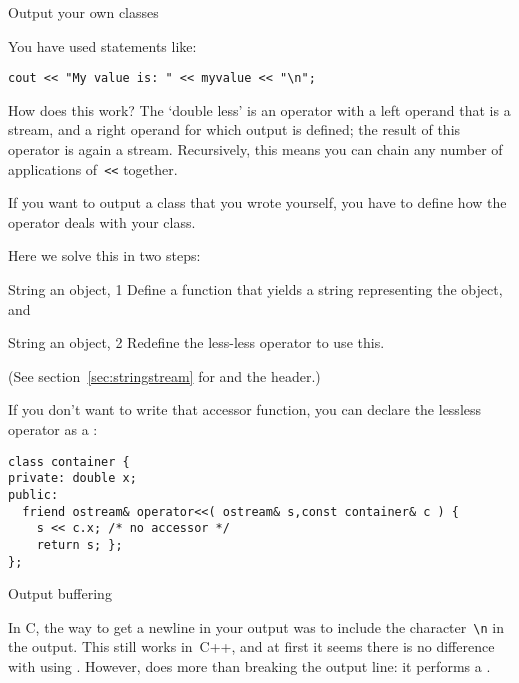  {Output your own classes}
\label{sec:lessless}

You have used statements like:
\begin{verbatim}
cout << "My value is: " << myvalue << "\n";
\end{verbatim}
How does this work? The `double less' is an operator with a left
operand that is a stream, and a right operand for which output is
defined; the result of this operator is again a stream. Recursively,
this means you can chain any number of applications of~\verb+<<+
together.

  If you want to output a class that you wrote yourself, you have to
  define how the \n{<<} operator deals with your class.

Here we solve this in two steps:

\begin{block}{String an object, 1}
  \label{sl:class-cout1}
 Define a function that yields a string representing the object, and 

  \lstset{style=snippetcode}
\end{block}

\begin{block}{String an object, 2}
  \label{sl:class-cout2}
  Redefine the less-less operator to use this.

  \lstset{style=snippetcode}
\end{block}

(See section~\ref{sec:stringstream} for  and the
 header.)


If you don't want to write that accessor function, you can declare
the lessless operator as a :
\begin{lstlisting}
class container {
private: double x;
public:
  friend ostream& operator<<( ostream& s,const container& c ) {
    s << c.x; /* no accessor */
    return s; };
};
\end{lstlisting}

 {Output buffering}
\label{sec:to-endl-or-not}

In C, the way to get a newline in your output was to include the
character~\verb+\n+ in the output. This still works in~C++, and at
first it seems there is no difference with using . However,
 does more than breaking the output line: it
performs a .

